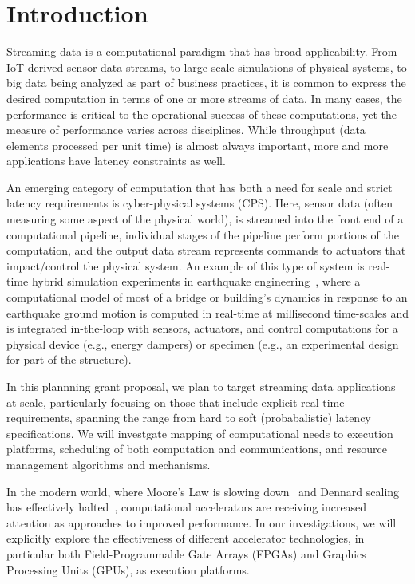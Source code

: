 \section{Introduction}
\label{sec:intro}

Streaming data is a computational paradigm that has broad applicability.
From IoT-derived sensor data streams, to large-scale simulations of physical
systems, to big data being analyzed as part of business practices, it is common
to express the desired computation in terms of one or more streams of data.
In many cases, the performance is critical to the operational success of these
computations, yet the measure of performance varies across disciplines.
While throughput (data elements processed per unit time) is almost always
important, more and more applications have latency constraints as well.

An emerging category of computation that has both a need for scale and
strict latency requirements is cyber-physical systems (CPS). Here, sensor
data (often measuring some aspect of the physical world), is streamed
into the front end of a computational pipeline, individual stages of the
pipeline perform portions of the computation, and the output data
stream represents
commands to actuators that impact/control the physical system.
An example of this type of system is real-time hybrid simulation
experiments in earthquake engineering~\cite{RTHS}, where a computational model
of most of a bridge or building's dynamics in response to an earthquake
ground motion is computed in real-time at millisecond time-scales and is
integrated in-the-loop with sensors, actuators, and control computations
for a physical device (e.g., energy dampers) or specimen (e.g., an
experimental design for part of the structure).

In this plannning grant proposal, we plan to target streaming data 
applications at scale, particularly focusing on those that include explicit
real-time requirements, spanning the range from hard to soft (probabalistic)
latency specifications. We will
investgate mapping of computational needs to execution platforms,
scheduling of both computation and communications, and resource
management algorithms and mechanisms.

In the modern world, where Moore's Law is slowing down~\cite{Waldrop16}
and Dennard scaling has effectively halted~\cite{Bohr07},
computational accelerators are receiving increased 
attention as approaches to improved performance.  In our investigations,
we will explicitly explore the effectiveness of different accelerator
technologies, in particular both Field-Programmable Gate Arrays (FPGAs)
and Graphics Processing Units (GPUs), as execution platforms.

